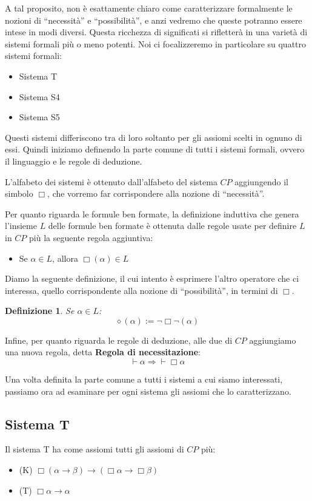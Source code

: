 \documentclass[a4paper, 12pt]{article}
\newtheorem{definition}{Definizione}
\begin{document}
A tal proposito, non è esattamente chiaro come caratterizzare formalmente
le nozioni di ``necessità'' e ``possibilità'', e anzi vedremo che queste potranno essere
intese in modi diversi.
Questa ricchezza di significati si rifletterà in una varietà di sistemi formali più o meno potenti.
Noi ci focalizzeremo in particolare su quattro sistemi formali:
\begin{itemize}
\item Sistema T
\item Sistema S4
\item Sistema S5
\end{itemize}

Questi sistemi differiscono tra di loro soltanto per gli assiomi scelti in ognuno di essi.
Quindi iniziamo definendo la parte comune di tutti i sistemi formali, ovvero il linguaggio
e le regole di deduzione.

L'alfabeto dei sistemi è ottenuto dall'alfabeto del sistema $CP$ aggiungendo il simbolo $\Box$,
che vorremo far corrispondere alla nozione di ``necessità''.

Per quanto riguarda le formule ben formate, la definizione induttiva che genera l'insieme $L$
delle formule ben formate è ottenuta dalle regole usate per definire $L$ in $CP$ più
la seguente regola aggiuntiva:
\begin{itemize}
\item Se $\alpha \in L$, allora $\Box (\alpha) \in L$
\end{itemize}

Diamo la seguente definizione, il cui intento è esprimere l'altro operatore
che ci interessa, quello corrispondente alla nozione di ``possibilità'', in termini di $\Box$.

\begin{definition}
Se $\alpha \in L$:
$$\diamond (\alpha) := \neg \Box \neg (\alpha)$$
\end{definition}

Infine, per quanto riguarda le regole di deduzione, alle due di $CP$ aggiungiamo
una nuova regola, detta \textbf{Regola di necessitazione}:
$$\vdash \alpha \Rightarrow \vdash \Box \alpha$$

Una volta definita la parte comune a tutti i sistemi a cui siamo interessati,
passiamo ora ad esaminare per ogni sistema gli assiomi che lo caratterizzano.

\subsection{Sistema T}
Il sistema T ha come assiomi tutti gli assiomi di $CP$ più:
\begin{itemize}
\item (K) $\Box (\alpha \rightarrow \beta) \rightarrow (\Box \alpha \rightarrow \Box \beta)$
\item (T) $\Box \alpha \rightarrow \alpha$
\end{itemize}
\end{document}
